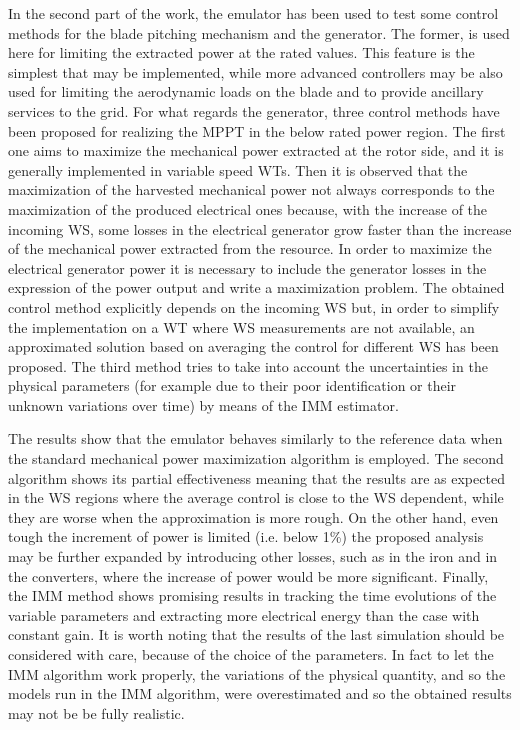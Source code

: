 In the second part of the work, the emulator has been used to test some control methods for the blade pitching mechanism and the generator. The former, is used here for limiting the extracted power at the rated values. This feature is the simplest that may be implemented, while more advanced controllers may be also used for limiting the aerodynamic loads on the blade and to provide ancillary services to the grid. For what regards the generator, three control methods have been proposed for realizing the \acrfull{MPPT} in the below rated power region. The first one aims to maximize the mechanical power extracted at the rotor side, and it is generally implemented in variable speed WTs. Then it is observed that the maximization of the harvested mechanical power not always corresponds to the maximization of the produced electrical ones because, with the increase of the incoming WS, some losses in the electrical generator grow faster than the increase of the mechanical power extracted from the resource. In order to maximize the electrical generator power it is necessary to include the generator losses in the expression of the power output and write a maximization problem. The obtained control method explicitly depends on the incoming WS but, in order to simplify the implementation on a WT where WS measurements are not available, an approximated solution based on averaging the control for different WS has been proposed. The third method tries to take into account the uncertainties in the physical parameters (for example due to their poor identification or their unknown variations over time) by means of the \acrfull{IMM} estimator. 

The results show that the emulator behaves similarly to the reference data when the standard mechanical power maximization algorithm is employed. The second algorithm shows its partial effectiveness meaning that the results are as expected in the WS regions where the average control is close to the WS dependent, while they are worse when the approximation is more rough. On the other hand, even tough the increment of power is limited (i.e. below 1\%) the proposed analysis may be further expanded by introducing other losses, such as in the iron and in the converters, where the increase of power would be more significant. Finally, the IMM method shows promising results in tracking the time evolutions of the variable parameters and extracting more electrical energy than the case with constant gain. It is worth noting that the results of the last simulation should be considered with care, because of the choice of the parameters. In fact to let the IMM algorithm work properly, the variations of the physical quantity, and so the models run in the IMM algorithm, were overestimated and so the obtained results may not be be fully realistic. 